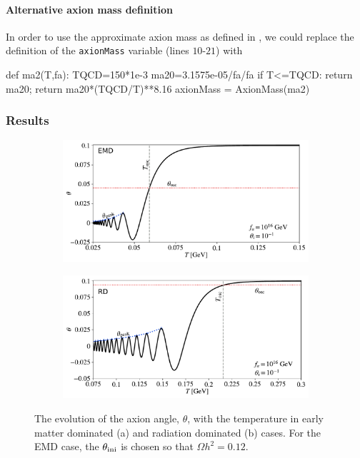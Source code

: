 \documentclass[11pt,a4paper]{article}
\begin{document}
\paragraph{Alternative axion mass definition}
%
In order to use the approximate axion mass as defined in , we could replace the definition of the {\tt axionMass} variable (lines $10$-$21$) with
%
\begin{py}
	def ma2(T,fa):
		TQCD=150*1e-3
		ma20=3.1575e-05/fa/fa
		if T<=TQCD:
			return ma20;
		return ma20*(TQCD/T)**8.16
	axionMass = AxionMass(ma2)
\end{py}

\subsubsection{Results}
%
\begin{figure}[h]
	\begin{subfigure}[]{0.5\textwidth}
		\includegraphics[width=1\textwidth]{figs/theta_evolution-EMD.pdf}
		\caption{}
		\label{fig:theta_evolution-EMD}
	\end{subfigure}
	\begin{subfigure}[]{0.5\textwidth}
		\includegraphics[width=1\textwidth]{figs/theta_evolution-RD.pdf}
		\caption{}
		\label{fig:theta_evolution-RD}
	\end{subfigure}
	\caption{The evolution of the axion angle, $\theta$, with the temperature in early matter dominated (a) and radiation dominated (b) cases. For the EMD case, the $\theta_{\rm ini}{}$ is chosen so that $\Omega h^2 = 0.12$.}
	\label{fig:results}
\end{figure}
\end{document}
